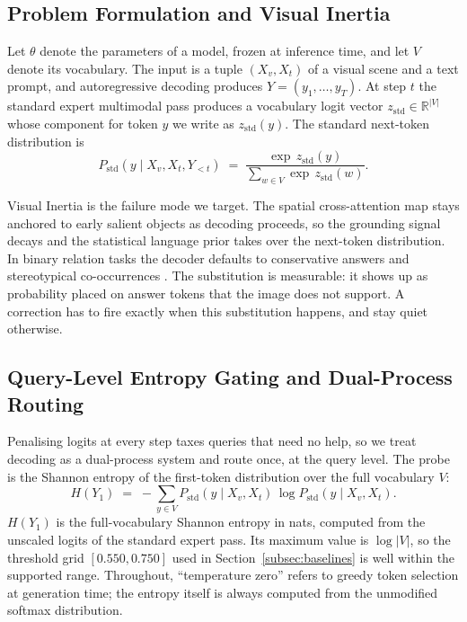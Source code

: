 \documentclass[pdflatex,sn-basic,Numbered]{sn-jnl}
\theoremstyle{thmstyleone}
\theoremstyle{thmstyletwo}
\theoremstyle{thmstylethree}
\begin{document}
\subsection{Problem Formulation and Visual Inertia}\label{subsec:problem}

Let $\theta$ denote the parameters of a model, frozen at inference time, and let $V$ denote its vocabulary. The input is a tuple $(X_{v}, X_{t})$ of a visual scene and a text prompt, and autoregressive decoding produces $Y = (y_{1}, \ldots, y_{T})$. At step $t$ the standard expert multimodal pass produces a vocabulary logit vector $z_{\text{std}} \in \mathbb{R}^{|V|}$ whose component for token $y$ we write as $z_{\text{std}}(y)$. The standard next-token distribution is
\begin{equation}\label{eq:std}
P_{\text{std}}(y \mid X_{v}, X_{t}, Y_{<t}) \;=\; \frac{\exp\, z_{\text{std}}(y)}{\sum_{w \in V} \exp\, z_{\text{std}}(w)}.
\end{equation}

Visual Inertia \cite{gong2026attention} is the failure mode we target. The spatial cross-attention map stays anchored to early salient objects as decoding proceeds, so the grounding signal decays and the statistical language prior takes over the next-token distribution. In binary relation tasks the decoder defaults to conservative answers and stereotypical co-occurrences \cite{yin2025mirage}. The substitution is measurable: it shows up as probability placed on answer tokens that the image does not support. A correction has to fire exactly when this substitution happens, and stay quiet otherwise.

\subsection{Query-Level Entropy Gating and Dual-Process Routing}\label{subsec:gate}

Penalising logits at every step taxes queries that need no help, so we treat decoding as a dual-process system \cite{kahneman2011thinking} and route once, at the query level. The probe is the Shannon entropy \cite{shannon1948mathematical} of the first-token distribution over the full vocabulary $V$:
\begin{equation}\label{eq:entropy}
H(Y_{1}) \;=\; -\sum_{y \in V} P_{\text{std}}(y \mid X_{v}, X_{t})\, \log P_{\text{std}}(y \mid X_{v}, X_{t}).
\end{equation}
$H(Y_{1})$ is the full-vocabulary Shannon entropy in nats, computed from the unscaled logits of the standard expert pass. Its maximum value is $\log |V|$, so the threshold grid $[0.550, 0.750]$ used in Section~\ref{subsec:baselines} is well within the supported range. Throughout, ``temperature zero'' refers to greedy token selection at generation time; the entropy itself is always computed from the unmodified softmax distribution.
\end{document}
